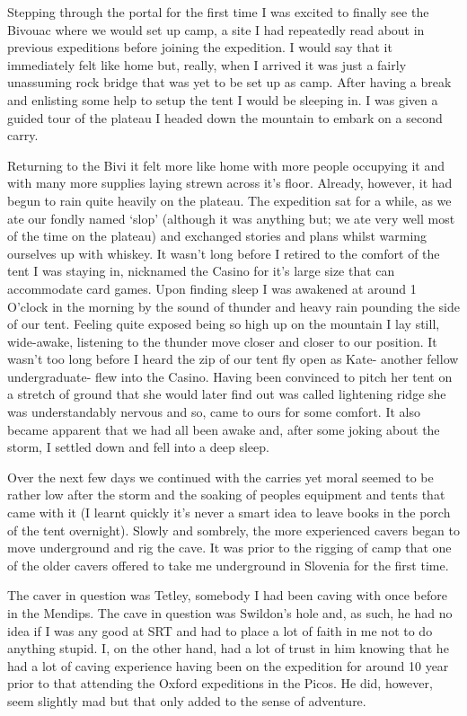 Stepping through the portal for the first time I was excited to finally
see the Bivouac where we would set up camp, a site I had repeatedly read
about in previous expeditions before joining the expedition. I would say
that it immediately felt like home but, really, when I arrived it was
just a fairly unassuming rock bridge that was yet to be set up as camp.
After having a break and enlisting some help to setup the tent I would
be sleeping in. I was given a guided tour of the plateau I headed down
the mountain to embark on a second carry.

Returning to the Bivi it felt more like home with more people occupying
it and with many more supplies laying strewn across it's floor. Already,
however, it had begun to rain quite heavily on the plateau. The
expedition sat for a while, as we ate our fondly named `slop' (although
it was anything but; we ate very well most of the time on the plateau)
and exchanged stories and plans whilst warming ourselves up with
whiskey. It wasn't long before I retired to the comfort of the tent I
was staying in, nicknamed the Casino for it's large size that can
accommodate card games. Upon finding sleep I was awakened at around 1
O'clock in the morning by the sound of thunder and heavy rain pounding
the side of our tent. Feeling quite exposed being so high up on the
mountain I lay still, wide-awake, listening to the thunder move closer
and closer to our position. It wasn't too long before I heard the zip of
our tent fly open as Kate- another fellow undergraduate- flew into the
Casino. Having been convinced to pitch her tent on a stretch of ground
that she would later find out was called lightening ridge she was
understandably nervous and so, came to ours for some comfort. It also
became apparent that we had all been awake and, after some joking about
the storm, I settled down and fell into a deep sleep.

Over the next few days we continued with the carries yet moral seemed to
be rather low after the storm and the soaking of peoples equipment and
tents that came with it (I learnt quickly it's never a smart idea to
leave books in the porch of the tent overnight). Slowly and sombrely,
the more experienced cavers began to move underground and rig the cave.
It was prior to the rigging of camp that one of the older cavers offered
to take me underground in Slovenia for the first time.

The caver in question was Tetley, somebody I had been caving with once
before in the Mendips. The cave in question was Swildon's hole and, as
such, he had no idea if I was any good at SRT and had to place a lot of
faith in me not to do anything stupid. I, on the other hand, had a lot
of trust in him knowing that he had a lot of caving experience having
been on the expedition for around 10 year prior to that attending the
Oxford expeditions in the Picos. He did, however, seem slightly mad but
that only added to the sense of adventure.


